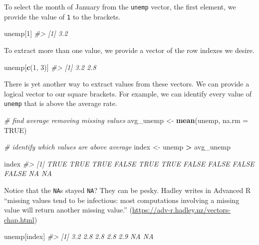 \documentclass[
]{book}
\newenvironment{Shaded}{\begin{snugshade}}{\end{snugshade}}
\newcommand{\CommentTok}[1]{\textcolor[rgb]{0.56,0.35,0.01}{\textit{#1}}}
\newcommand{\DataTypeTok}[1]{\textcolor[rgb]{0.13,0.29,0.53}{#1}}
\newcommand{\DecValTok}[1]{\textcolor[rgb]{0.00,0.00,0.81}{#1}}
\newcommand{\KeywordTok}[1]{\textcolor[rgb]{0.13,0.29,0.53}{\textbf{#1}}}
\newcommand{\NormalTok}[1]{#1}
\newcommand{\OperatorTok}[1]{\textcolor[rgb]{0.81,0.36,0.00}{\textbf{#1}}}
\newcommand{\OtherTok}[1]{\textcolor[rgb]{0.56,0.35,0.01}{#1}}
\newcommand{\StringTok}[1]{\textcolor[rgb]{0.31,0.60,0.02}{#1}}
\begin{document}
To select the month of January from the \texttt{unemp} vector, the first element, we provide the value of \texttt{1} to the brackets.

\begin{Shaded}
\begin{Highlighting}[]
\NormalTok{unemp[}\DecValTok{1}\NormalTok{]}
\CommentTok{\#\textgreater{} [1] 3.2}
\end{Highlighting}
\end{Shaded}

To extract more than one value, we provide a vector of the row indexes we desire.

\begin{Shaded}
\begin{Highlighting}[]
\NormalTok{unemp[}\KeywordTok{c}\NormalTok{(}\DecValTok{1}\NormalTok{, }\DecValTok{3}\NormalTok{)]}
\CommentTok{\#\textgreater{} [1] 3.2 2.8}
\end{Highlighting}
\end{Shaded}

There is yet another way to extract values from these vectors. We can provide a logical vector to our square brackets. For example, we can identify every value of \texttt{unemp} that is above the average rate.

\begin{Shaded}
\begin{Highlighting}[]
\CommentTok{\# find average removing missing values}
\NormalTok{avg\_unemp \textless{}{-}}\StringTok{ }\KeywordTok{mean}\NormalTok{(unemp, }\DataTypeTok{na.rm =} \OtherTok{TRUE}\NormalTok{)}

\CommentTok{\# identify which values are above average}
\NormalTok{index \textless{}{-}}\StringTok{ }\NormalTok{unemp }\OperatorTok{\textgreater{}}\StringTok{ }\NormalTok{avg\_unemp}

\NormalTok{index}
\CommentTok{\#\textgreater{}  [1]  TRUE  TRUE  TRUE FALSE  TRUE  TRUE FALSE FALSE FALSE FALSE    NA    NA}
\end{Highlighting}
\end{Shaded}

Notice that the \texttt{NA}s stayed \texttt{NA}? They can be pesky. Hadley writes in Advanced R ``missing values tend to be infectious: most computations involving a missing value will return another missing value.'' (\url{https://adv-r.hadley.nz/vectors-chap.html})

\begin{Shaded}
\begin{Highlighting}[]
\NormalTok{unemp[index]}
\CommentTok{\#\textgreater{} [1] 3.2 2.8 2.8 2.8 2.9  NA  NA}
\end{Highlighting}
\end{Shaded}
\end{document}
